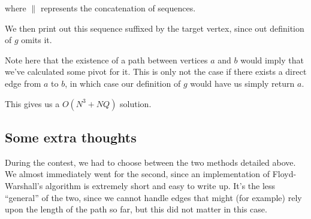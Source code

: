 \noindent
where $\|$ represents the concatenation of sequences.

We then print out this sequence suffixed by the target vertex, since out
definition of $g$ omits it.

Note here that the existence of a path between vertices $a$ and $b$ would imply
that we've calculated some pivot for it. This is only not the case if there
exists a direct edge from $a$ to $b$, in which case our definition of $g$ would
have us simply return $a$.

This gives us a $O(N^3 + NQ)$ solution.

\subsection*{Some extra thoughts}

During the contest, we had to choose between the two methods detailed above. We
almost immediately went for the second, since an implementation of
Floyd-Warshall's algorithm is extremely short and easy to write up. It's the
less ``general'' of the two, since we cannot handle edges that might (for
example) rely upon the length of the path so far, but this did not matter in
this case.
